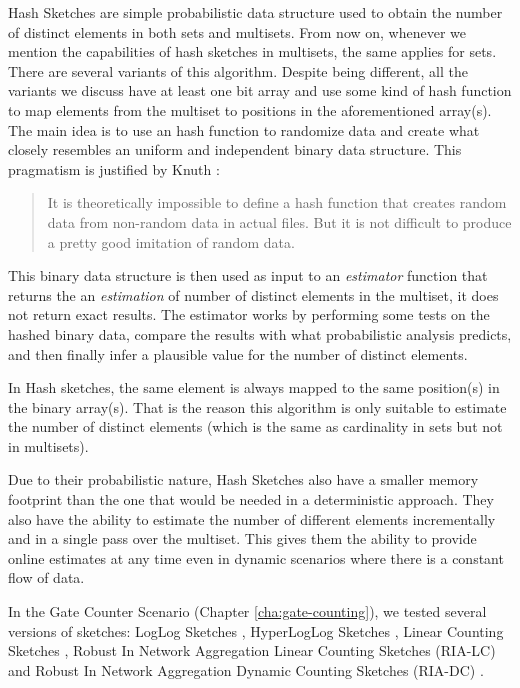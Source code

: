 Hash Sketches are simple probabilistic data structure used to obtain
the number of distinct elements in both sets and multisets. From now
on, whenever we mention the capabilities of hash sketches in
multisets, the same applies for sets. There are several variants of
this algorithm. Despite being different, all the variants we discuss
have at least one bit array and use some kind of hash function to map
elements from the multiset to positions in the aforementioned
array(s). The main idea is to use an hash function to randomize data
and create what closely resembles an uniform and independent binary
data structure. This pragmatism is justified by Knuth
\cite{knuth1998art}:
\begin{quotation}
It is theoretically impossible to define a hash
function that creates random data from non-random data in actual
files. But it is not difficult to produce a pretty good imitation of
random data.  
\end{quotation}
This binary data structure is then used as input to an
\emph{estimator} function that returns the an \emph{estimation} of
number of distinct elements in the multiset, it does not return exact
results. The estimator works by performing some tests on the hashed
binary data, compare the results with what probabilistic analysis
predicts, and then finally infer a plausible value for the number of
distinct elements.

In Hash sketches, the same element is always mapped to the same
position(s) in the binary array(s). That is the reason this algorithm
is only suitable to estimate the number of distinct elements (which
is the same as cardinality in sets but not in multisets).

Due to their probabilistic nature, Hash Sketches also have a smaller
memory footprint than the one that would be needed in a deterministic
approach. They also have the ability to estimate
the number of different elements incrementally and in a single pass
over the multiset. This gives them the ability to provide online
estimates at any time even in dynamic scenarios where there is a
constant flow of data. 

In the Gate Counter Scenario (Chapter \ref{cha:gate-counting}), we
tested several versions of sketches: LogLog Sketches
\cite{Durand:2003tc}, HyperLogLog Sketches \cite{Fusy:2007um}, Linear
Counting Sketches \cite{Whang:1990uh}, Robust In Network Aggregation
Linear Counting Sketches (RIA-LC)
\cite{Fan:2008wl,YaoChungFanArbeeLPChen:2010to} and Robust In Network
Aggregation Dynamic Counting Sketches (RIA-DC)
\cite{YaoChungFanArbeeLPChen:2010to}.

